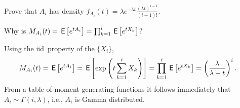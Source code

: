 \documentclass[queueing-book.tex]{subfiles}
\begin{document}
\begin{exercise}\label{ex:54}
 Prove that $A_i$ has density %
$f_{A_i}(t) = \lambda e^{-\lambda t} \frac{(\lambda t)^{i-1}}{(i-1)!}$.
\begin{hint}
Why is $M_{A_i}(t) = \,\mathsf{E}\left[e^{t A_i}\right] = \prod_{k=1}^{i} \,\mathsf{E}\left[e^{tX_k}\right]$?
\end{hint}
\begin{solution}
 Using the iid\ property of the $\{X_i\}$,
\begin{align*}
 M_{A_i}(t) &= \,\mathsf{E}\left[e^{t A_i}\right] = \,\mathsf{E}\left[\exp\left(t\sum_{k=1}^{i} X_k\right)\right]  = \prod_{k=1}^{i} \,\mathsf{E}\left[e^{tX_k}\right] =
  \left(\frac{\lambda}{\lambda -t }\right)^i.
\end{align*}
From a table of moment-generating functions it follows immediately that
$A_i \sim \Gamma(i,\lambda)$, i.e., $A_i$ is Gamma distributed.
\end{solution}
\end{exercise}

\end{document}
